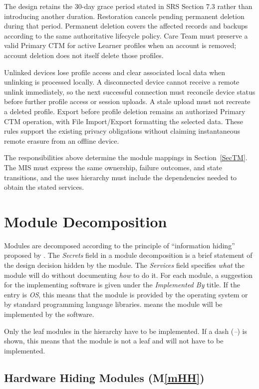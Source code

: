 \documentclass[12pt, titlepage]{article}
\newcommand{\mref}[1]{M\ref{#1}}
\begin{document}
The design retains the 30-day grace period stated in SRS Section 7.3 rather
than introducing another duration. Restoration cancels pending permanent
deletion during that period. Permanent deletion covers the affected records
and backups according to the same authoritative lifecycle policy. Care Team
must preserve a valid Primary CTM for active Learner profiles when an account
is removed; account deletion does not itself delete those profiles.

Unlinked devices lose profile access and clear associated local data when
unlinking is processed locally. A disconnected device cannot receive a remote
unlink immediately, so the next successful connection must reconcile device
status before further profile access or session uploads. A stale upload must
not recreate a deleted profile. Export before profile deletion remains an
authorized Primary CTM operation, with File Import/Export formatting the
selected data. These rules support the existing privacy obligations without
claiming instantaneous remote erasure from an offline device.

The responsibilities above determine the module mappings in
Section~\ref{SecTM}. The MIS must express the same ownership, failure outcomes,
and state transitions, and the uses hierarchy must include the dependencies
needed to obtain the stated services.

\section{Module Decomposition} \label{SecMD}

Modules are decomposed according to the principle of ``information hiding''
proposed by \citet{ParnasEtAl1984}. The \emph{Secrets} field in a module
decomposition is a brief statement of the design decision hidden by the
module. The \emph{Services} field specifies \emph{what} the module will do
without documenting \emph{how} to do it. For each module, a suggestion for the
implementing software is given under the \emph{Implemented By} title. If the
entry is \emph{OS}, this means that the module is provided by the operating
system or by standard programming language libraries.  \emph{\progname{}} means the
module will be implemented by the \progname{} software.

Only the leaf modules in the hierarchy have to be implemented. If a dash
(\emph{--}) is shown, this means that the module is not a leaf and will not have
to be implemented.

\subsection{Hardware Hiding Modules (\mref{mHH})}
\end{document}

